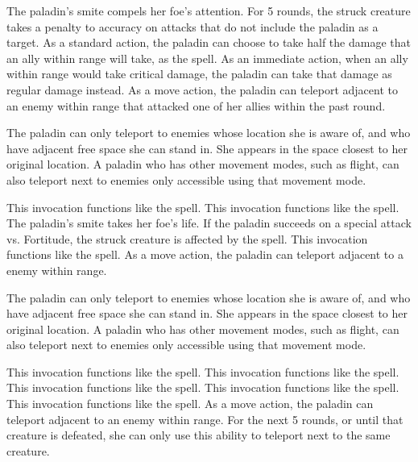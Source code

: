 The paladin's smite compels her foe's attention.
For 5 rounds, the struck creature takes a  penalty to accuracy on attacks that do not include the paladin as a target.
 As a standard action, the paladin can choose to take half the damage that an ally within \rngmed range will take, as the 
spell.
As an immediate action, when an ally within \rngmed range would take critical damage, the paladin can take that damage as regular damage instead.
As a move action, the paladin can teleport adjacent to an enemy within \rngmed range that attacked one of her allies within the past round.

The paladin can only teleport to enemies whose location she is aware of, and who have adjacent free space she can stand in.
She appears in the space closest to her original location.
A paladin who has other movement modes, such as flight, can also teleport next to enemies only accessible using that movement mode.

 This invocation functions like the 
spell.
 This invocation functions like the 
spell.
The paladin's smite takes her foe's life.
If the paladin succeeds on a special attack vs. Fortitude, the struck creature is affected by the  spell.
 This invocation functions like the 
spell.
As a move action, the paladin can teleport adjacent to a \bloodied enemy within \rngmed range.

The paladin can only teleport to enemies whose location she is aware of, and who have adjacent free space she can stand in.
She appears in the space closest to her original location.
A paladin who has other movement modes, such as flight, can also teleport next to enemies only accessible using that movement mode.

 This invocation functions like the 
spell.
 This invocation functions like the 
spell.
 This invocation functions like the 
spell.
 This invocation functions like the 
spell.
 This invocation functions like the 
spell.
As a move action, the paladin can teleport adjacent to an enemy within \rngmed range.
For the next 5 rounds, or until that creature is defeated, she can only use this ability to teleport next to the same creature.

